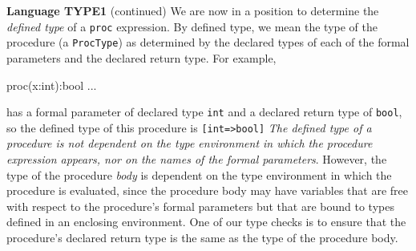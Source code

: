 \begin{minipage}[t]{\sw}
\slidenumber
\LARGE
{\bf Language TYPE1} (continued)\exx
We are now in a position to determine the {\em defined type}
of a \verb'proc' expression.
By defined type, we mean the type
of the procedure (a \verb'ProcType') as determined by the declared types
of each of the formal parameters and the declared return type.
For example,
\begin{qv}
proc(x:int):bool ...
\end{qv}
has a formal parameter of declared type \verb'int'
and a declared return type of \verb'bool',
so the defined type of this procedure is \verb'[int=>bool]'
{\em The defined type of a procedure is not dependent on
the type environment in which the procedure expression appears,
nor on the names of the formal parameters}.\exx
However, the type of the procedure {\em body} is dependent on
the type environment in which the procedure is evaluated,
since the procedure body may have variables that are free
with respect to the procedure's formal parameters
but that are bound to types defined in an enclosing environment.
One of our type checks is to ensure
that the procedure's declared return type is the same
as the type of the procedure body.\exx
\end{minipage}
